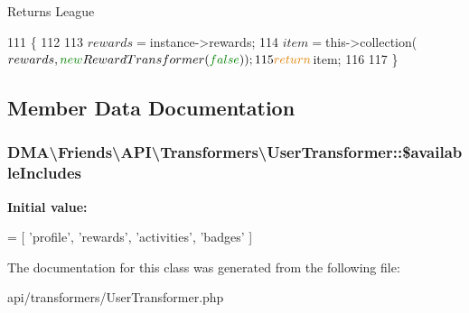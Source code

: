 \begin{DoxyReturn}{Returns}
League 
\end{DoxyReturn}

\begin{DoxyCode}
111     \{
112     
113         $rewards = $instance->rewards;
114         $item = $this->collection($rewards, \textcolor{keyword}{new} RewardTransformer(\textcolor{keyword}{false}));
115         \textcolor{keywordflow}{return} $item;
116     
117     \}
\end{DoxyCode}


\subsection{Member Data Documentation}
\hypertarget{classDMA_1_1Friends_1_1API_1_1Transformers_1_1UserTransformer_aa77a950bb8a66a7454ffae02e7e5982c}{}
\subsubsection[{\$available\+Includes}]{\setlength{\rightskip}{0pt plus 5cm}D\+M\+A\textbackslash{}\+Friends\textbackslash{}\+A\+P\+I\textbackslash{}\+Transformers\textbackslash{}\+User\+Transformer\+::\$available\+Includes\hspace{0.3cm}{\ttfamily [protected]}}\label{classDMA_1_1Friends_1_1API_1_1Transformers_1_1UserTransformer_aa77a950bb8a66a7454ffae02e7e5982c}
{\bfseries Initial value\+:}
\begin{DoxyCode}
= [
            \textcolor{stringliteral}{'profile'},
            \textcolor{stringliteral}{'rewards'},
            \textcolor{stringliteral}{'activities'},
            \textcolor{stringliteral}{'badges'}
    ]
\end{DoxyCode}


The documentation for this class was generated from the following file\+:\begin{DoxyCompactItemize}
\item 
api/transformers/User\+Transformer.\+php\end{DoxyCompactItemize}
